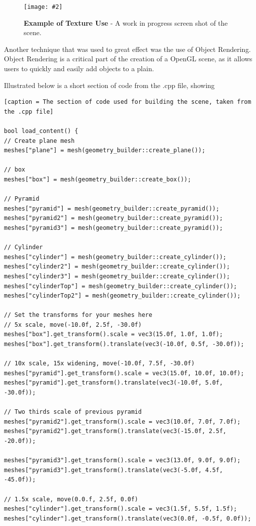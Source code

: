 \documentclass[10pt, a4paper]{article}
\newcommand{\figuremacro}[5]{
    \begin{figure}[#1]
        \centering
        \texttt{[image: \#2]}
        \caption[#3]{\textbf{#3}#4}
        \label{fig:#2}
    \end{figure}
}
\begin{document}
     \figuremacro{h}{pyramids}{Example of Texture Use}{ - A work in progress screen shot of the scene.}{1.0}
    
    Another technique that was used to great effect was the use of Object Rendering. Object Rendering is a critical part of the creation of a OpenGL scene, as it allows users to quickly and easily add objects to a plain.
    
    Illustrated below is a short section of code from the .cpp file, showing 
    

	
\begin{lstlisting}[caption = The section of code used for building the scene, taken from the .cpp file]

bool load_content() {
// Create plane mesh
meshes["plane"] = mesh(geometry_builder::create_plane());

// box
meshes["box"] = mesh(geometry_builder::create_box());

// Pyramid
meshes["pyramid"] = mesh(geometry_builder::create_pyramid());
meshes["pyramid2"] = mesh(geometry_builder::create_pyramid());
meshes["pyramid3"] = mesh(geometry_builder::create_pyramid());

// Cylinder
meshes["cylinder"] = mesh(geometry_builder::create_cylinder());
meshes["cylinder2"] = mesh(geometry_builder::create_cylinder());
meshes["cylinder3"] = mesh(geometry_builder::create_cylinder());
meshes["cylinderTop"] = mesh(geometry_builder::create_cylinder());
meshes["cylinderTop2"] = mesh(geometry_builder::create_cylinder());

// Set the transforms for your meshes here
// 5x scale, move(-10.0f, 2.5f, -30.0f)
meshes["box"].get_transform().scale = vec3(15.0f, 1.0f, 1.0f);
meshes["box"].get_transform().translate(vec3(-10.0f, 0.5f, -30.0f));

// 10x scale, 15x widening, move(-10.0f, 7.5f, -30.0f)
meshes["pyramid"].get_transform().scale = vec3(15.0f, 10.0f, 10.0f);
meshes["pyramid"].get_transform().translate(vec3(-10.0f, 5.0f, -30.0f));

// Two thirds scale of previous pyramid
meshes["pyramid2"].get_transform().scale = vec3(10.0f, 7.0f, 7.0f);
meshes["pyramid2"].get_transform().translate(vec3(-15.0f, 2.5f, -20.0f));

meshes["pyramid3"].get_transform().scale = vec3(13.0f, 9.0f, 9.0f);
meshes["pyramid3"].get_transform().translate(vec3(-5.0f, 4.5f, -45.0f));

// 1.5x scale, move(0.0.f, 2.5f, 0.0f)
meshes["cylinder"].get_transform().scale = vec3(1.5f, 5.5f, 1.5f);
meshes["cylinder"].get_transform().translate(vec3(0.0f, -0.5f, 0.0f));


\end{lstlisting}
\end{document}
